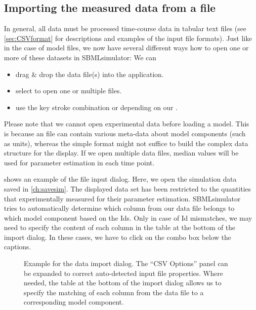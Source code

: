 \subsection{Importing the measured data from a file}
\label{sec:opendata}

In general, all data must be processed time-course data in tabular text files (see \cref{sec:CSVformat} for descriptions and examples of the input file formats).
Just like in the case of model files, we now have several different ways how to open one or more of these datasets in SBMLsimulator: We can
\begin{itemize}
  \item drag \& drop the data file(s) into the application.
  \item select  to open one or multiple files.
  \item use the key stroke combination  or  depending on our \OS.
\end{itemize}
Please note that we cannot open experimental data before loading a model.
This is because an \SBML file can contain various meta-data about model components (such as units), whereas the simple \CSV format might not suffice to build the complex data structure for the display.
If we open multiple data files, median values will be used for parameter estimation in each time point.

 shows an example of the file input dialog.
Here, we open the simulation data saved in \cref{ch:savesim}.
The displayed data set has been restricted to the quantities that \citeauthor{Bucher2011} experimentally measured for their parameter estimation.
SBMLsimulator tries to automatically determine which column from our data file belongs to which model component based on the \acp{Id}.
Only in case of \ac{Id} mismatches, we may need to specify the content of each column in the table at the bottom of the import dialog.
In these cases, we have to click on the combo box below the captions.
\begin{SCfigure}%
{}
\caption[Example for the data import dialog]{Example for the data import dialog.
The ``CSV Options'' panel can be expanded to correct auto-detected input file properties.
Where needed, the table at the bottom of the import dialog allows us to specify the matching of each column from the data file to a corresponding model component.}
\label{fig:inputdialog}
\end{SCfigure}

